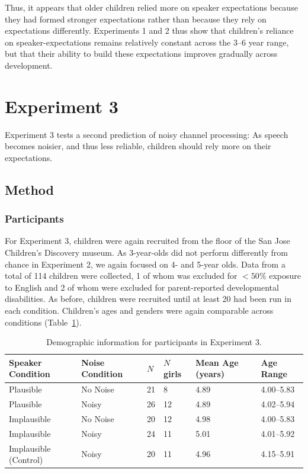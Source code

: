 \documentclass[man,floatsintext]{apa6}
\begin{document}
Thus, it appears that older children relied more on speaker expectations because they had formed stronger expectations rather than because they rely on expectations differently. Experiments 1 and 2 thus show that children's reliance on speaker-expectations remains relatively constant across the 3--6 year range, but that their ability to build these expectations improves gradually across development.


\section{Experiment 3}

Experiment 3 tests a second prediction of noisy channel processing: As speech becomes noisier, and thus less reliable, children should rely more on their expectations.

\subsection{Method}

\subsubsection{Participants}

For Experiment 3, children were again recruited from the floor of the San Jose Children's Discovery museum. As 3-year-olds did not perform differently from chance in Experiment 2, we again focused on 4- and 5-year olds. Data from a total of 114 children were collected, 1 of whom was excluded for $<50\%$ exposure to English and 2 of whom were excluded for parent-reported developmental disabilities. As before, children were recruited until at least 20 had been run in each condition. Children's ages and genders were again comparable across conditions (Table~\ref{tab:exp3_demos}).


\begin{table}[tb]
\begin{center}
\begin{tabular}{llllll}
 Speaker Condition & Noise Condition & $N$ & $N$ girls & Mean Age (years) & Age Range\\ 
  \hline
  Plausible & No Noise & 21 & 8 & 4.89 & 4.00--5.83 \\ 
  Plausible & Noisy & 26 & 12 & 4.89 & 4.02--5.94 \\ 
  Implausible & No Noise & 20 & 12 & 4.98 & 4.00--5.83 \\ 
  Implausible & Noisy & 24 & 11 & 5.01 & 4.01--5.92 \\ 
  Implausible (Control) & Noisy & 20 & 11 & 4.96 & 4.15--5.91 \\ 
   \hline
\end{tabular}\end{center}
\vspace{6pt}
\caption{\label{tab:exp3_demos}Demographic information for participants in Experiment 3.}
\end{table}
\end{document}
